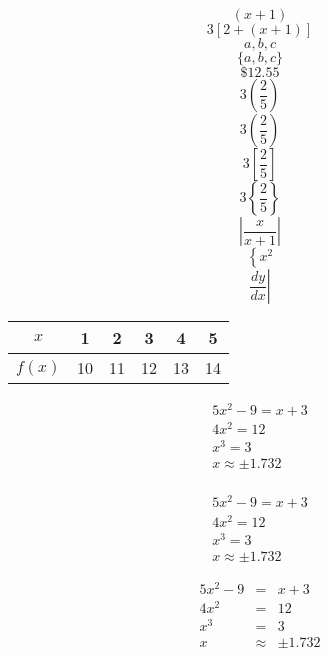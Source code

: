 \documentclass[11pt]{article}
\begin{document}
$$(x+1)$$
$$3[2+(x+1)]$$
$${a,b,c}$$
$$\{a,b,c\}$$
$$\$12.55$$
$$3(\frac{2}{5})$$
$$3\left(\frac{2}{5}\right)$$
$$3\left[\frac{2}{5}\right]$$
$$3\left\{\frac{2}{5}\right\}$$
$$\left|\frac{x}{x+1}\right|$$
$$\left\{x^2\right.$$
$$\left.\frac{dy}{dx}\right|$$

\begin{tabular}{|c|c|c|c|c|c|}
\hline
$x$ & 1 & 2 & 3 & 4 & 5\\ \hline
$f(x)$ & 10 & 11 & 12 & 13 & 14\\ \hline
\end{tabular}

\begin{eqnarray}
5x^2-9=x+3\\
4x^2=12\\
x^3=3\\
x\approx\pm1.732\\
\end{eqnarray}

\begin{eqnarray}
5x^2-9=x+3\\
4x^2=12\\
x^3=3\\
x\approx\pm1.732
\end{eqnarray}

\begin{eqnarray*}
5x^2-9&=&x+3\\
4x^2&=&12\\
x^3&=&3\\
x&\approx&\pm1.732
\end{eqnarray*}
\end{document}
